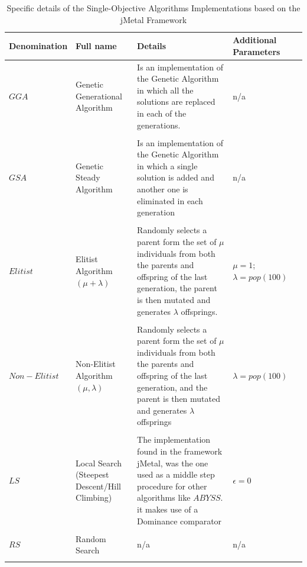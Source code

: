 \begin{table}[]
    \begin{tabular}{p{}p{}p{}p{}p{}}
    \hline
    Denomination  & Full name & Details & Additional Parameters
    \\
    \hline
    $GGA$ & Genetic Generational Algorithm & Is an implementation of the Genetic Algorithm in which all the solutions are replaced in each of the generations. & n/a \\ \\
    $GSA$ & Genetic Steady Algorithm & Is an implementation of the Genetic Algorithm in which a single solution is added and another one is eliminated in each generation & n/a \\ \\
    $Elitist$ & Elitist Algorithm $(\mu + \lambda)$ & Randomly selects a parent form the set of $\mu$ individuals from both the parents and offspring of the last generation, the parent is then mutated and generates $\lambda$ offsprings. & $\mu = 1$; $\lambda = pop (100)$ \\ \\
    $Non - Elitist$ & Non-Elitist Algorithm $(\mu,\lambda)$ & Randomly selects a parent form the set of $\mu$ individuals from both the parents and offspring of the last generation, and the parent is then mutated and generates $\lambda$ offsprings  & $\lambda = pop (100)$ \\ \\
    $LS$ & Local Search (Steepest Descent/Hill Climbing) & The implementation found in the framework jMetal, was the one used as a middle step procedure for other algorithms like $ABYSS$. it makes use of a Dominance comparator & $\epsilon = 0$ \\ \\
    $RS$ & Random Search & n/a & n/a  \\ \\
    \hline
    \end{tabular}
    \caption{Specific details of the Single-Objective Algorithms Implementations based on the jMetal Framework}
    \label{table:soa_details_jmetal}
\end{table}

